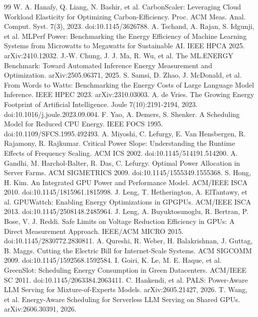 \documentclass[3p,twocolumn]{elsarticle}
\begin{document}
\begin{thebibliography}{99}
\label{r30} W. A. Hanafy, Q. Liang, N. Bashir, et al. CarbonScaler: Leveraging Cloud Workload Elasticity for
Optimizing Carbon-Efficiency. Proc. ACM Meas. Anal. Comput. Syst. 7(3), 2023. doi:10.1145/3626788.
\label{r31} A. Tschand, A. Rajan, S. Idgunji, et al. MLPerf Power: Benchmarking the Energy Efficiency of Machine
Learning Systems from Microwatts to Megawatts for Sustainable AI. IEEE HPCA 2025. arXiv:2410.12032.
\label{r32} J.-W. Chung, J. J. Ma, R. Wu, et al. The ML.ENERGY Benchmark: Toward Automated Inference Energy
Measurement and Optimization. arXiv:2505.06371, 2025.
\label{r33} S. Samsi, D. Zhao, J. McDonald, et al. From Words to Watts: Benchmarking the Energy Costs of Large
Language Model Inference. IEEE HPEC 2023. arXiv:2310.03003.
\label{r34} A. de Vries. The Growing Energy Footprint of Artificial Intelligence. Joule 7(10):2191-2194, 2023.
doi:10.1016/j.joule.2023.09.004.
\label{r35} F. Yao, A. Demers, S. Shenker. A Scheduling Model for Reduced CPU Energy. IEEE FOCS 1995.
doi:10.1109/SFCS.1995.492493.
\label{r36} A. Miyoshi, C. Lefurgy, E. Van Hensbergen, R. Rajamony, R. Rajkumar. Critical Power Slope: Understanding
the Runtime Effects of Frequency Scaling. ACM ICS 2002. doi:10.1145/514191.514200.
\label{r37} A. Gandhi, M. Harchol-Balter, R. Das, C. Lefurgy. Optimal Power Allocation in Server Farms. ACM SIGMETRICS
2009. doi:10.1145/1555349.1555368.
\label{r38} S. Hong, H. Kim. An Integrated GPU Power and Performance Model. ACM/IEEE ISCA 2010.
doi:10.1145/1815961.1815998.
\label{r39} J. Leng, T. Hetherington, A. ElTantawy, et al. GPUWattch: Enabling Energy Optimizations in GPGPUs. ACM/IEEE
ISCA 2013. doi:10.1145/2508148.2485964.
\label{r40} J. Leng, A. Buyuktosunoglu, R. Bertran, P. Bose, V. J. Reddi. Safe Limits on Voltage Reduction Efficiency
in GPUs: A Direct Measurement Approach. IEEE/ACM MICRO 2015. doi:10.1145/2830772.2830811.
\label{r41} A. Qureshi, R. Weber, H. Balakrishnan, J. Guttag, B. Maggs. Cutting the Electric Bill for Internet-Scale
Systems. ACM SIGCOMM 2009. doi:10.1145/1592568.1592584.
\label{r42} I. Goiri, K. Le, M. E. Haque, et al. GreenSlot: Scheduling Energy Consumption in Green Datacenters. ACM/IEEE
SC 2011. doi:10.1145/2063384.2063411.
\label{r43} C. Hankendi, et al. PALS: Power-Aware LLM Serving for Mixture-of-Experts Models. arXiv:2605.21427, 2026.
\label{r44} T. Wang, et al. Energy-Aware Scheduling for Serverless LLM Serving on Shared GPUs. arXiv:2606.30391, 2026.

\end{thebibliography}
\end{document}
